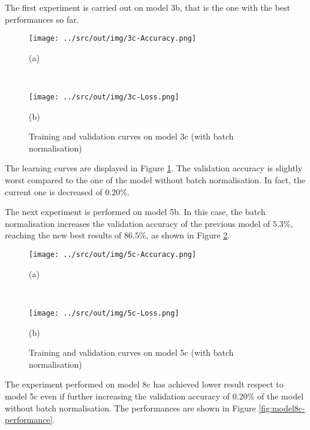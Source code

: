 \documentclass[a4paper,12pt]{article} %
\begin{document}
	The first experiment is carried out on model 3b, that is the one with the 
	best performances so far. 
	
	\begin{figure}[htb]
		\begin{minipage}[c]{.49\textwidth}
			\centering
			\texttt{[image: ../src/out/img/3c-Accuracy.png]}
			\caption*{(a)}
		\end{minipage}
		~
		\begin{minipage}[c]{.49\textwidth}
			\centering
			\texttt{[image: ../src/out/img/3c-Loss.png]}
			\caption*{(b)}
		\end{minipage}
		\caption{Training and validation curves on model 3c (with batch 
			normalisation)}
		\label{fig:model3c-performance}
	\end{figure}

	The learning curves are displayed in Figure \ref{fig:model3c-performance}. 
	The validation accuracy is slightly worst compared to the one of the model 
	without batch normalisation. In fact, the current one is decreased of 
	$0.20\%$. %
	\newline
		
	The next experiment is performed on model 5b. In this case, the batch 
	normalisation increases the validation accuracy of the previous model of 
	$5.3\%$, reaching the new best results of $86.5\%$, as shown in Figure 
	\ref{fig:model5c-performance}.
	
	\begin{figure}[htb]
		\begin{minipage}[c]{.49\textwidth}
			\centering
			\texttt{[image: ../src/out/img/5c-Accuracy.png]}
			\caption*{(a)}
		\end{minipage}
		~
		\begin{minipage}[c]{.49\textwidth}
			\centering
			\texttt{[image: ../src/out/img/5c-Loss.png]}
			\caption*{(b)}
		\end{minipage}
		\caption{Training and validation curves on model 5c (with batch 
			normalisation)}
		\label{fig:model5c-performance}
	\end{figure}
	
	The experiment performed on model 8c has achieved lower result respect to 
	model 5c even if further increasing the validation accuracy of $0.20\%$ of 
	the model without batch normalisation. 
	The performances are shown in Figure \ref{fig:model8c-performance}.
	\newline
\end{document}
